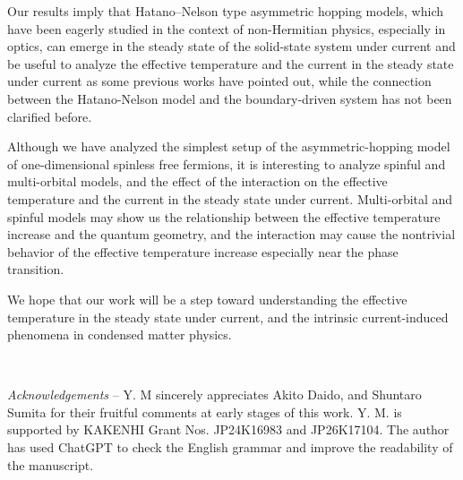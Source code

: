 \documentclass[a4paper, amsfonts, amssymb, amsmath, reprint, showkeys, nofootinbib, twoside,superscriptaddress, prl]{revtex4-2}
\begin{document}
Our results imply that Hatano--Nelson type asymmetric hopping models, which have been eagerly studied in the context of non-Hermitian physics, especially in optics, can emerge in the steady state of the solid-state system under current and be useful to analyze the effective temperature and the current in the steady state under current as some previous works have pointed out\cite{Hatano1996-sw, Fukui1998-ey, Takasan2025-ql, Cao2023-mh}, while the connection between the Hatano-Nelson model and the boundary-driven system has not been clarified before.

Although we have analyzed the simplest setup of the asymmetric-hopping model of one-dimensional spinless free fermions, it is interesting to analyze spinful and multi-orbital models, and the effect of the interaction on the effective temperature and the current in the steady state under current. Multi-orbital and spinful models may show us the relationship between the effective temperature increase and the quantum geometry, and the interaction may cause the nontrivial behavior of the effective temperature increase especially near the phase transition.

We hope that our work will be a step toward understanding the effective temperature in the steady state under current, and the intrinsic current-induced phenomena in condensed matter physics.

\

{\it{Acknowledgements}} --
Y. M sincerely appreciates Akito Daido, and Shuntaro Sumita for their fruitful comments at early stages of this work. Y. M. is supported by KAKENHI Grant Nos. JP24K16983 and JP26K17104. 
The author has used ChatGPT to check the English grammar and improve the readability of the manuscript.


%

\end{document}
